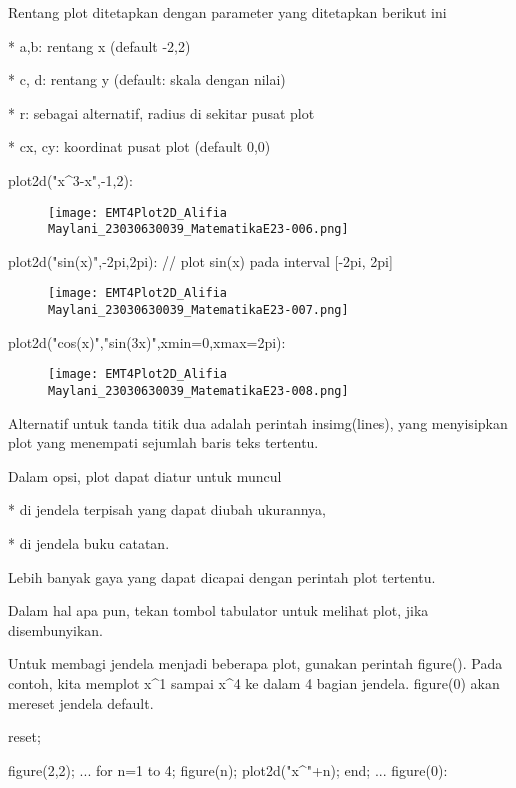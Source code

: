 \documentclass{article}
\begin{document}
Rentang plot ditetapkan dengan parameter yang ditetapkan berikut ini


* 
a,b: rentang x (default -2,2)

* 
c, d: rentang y (default: skala dengan nilai)

* 
r: sebagai alternatif, radius di sekitar pusat plot

* 
cx, cy: koordinat pusat plot (default 0,0)


\>plot2d("x^3-x",-1,2):


\begin{figure}
    \centering
    \texttt{[image: EMT4Plot2D\_Alifia Maylani\_23030630039\_MatematikaE23-006.png]}
    \caption{}
    \label{fig:enter-label}
\end{figure}

\>plot2d("sin(x)",-2\*pi,2\*pi): // plot sin(x) pada interval [-2pi, 2pi]


\begin{figure}
    \centering
    \texttt{[image: EMT4Plot2D\_Alifia Maylani\_23030630039\_MatematikaE23-007.png]}
    \caption{}
    \label{fig:enter-label}
\end{figure}

\>plot2d("cos(x)","sin(3\*x)",xmin=0,xmax=2pi):


\begin{figure}
    \centering
    \texttt{[image: EMT4Plot2D\_Alifia Maylani\_23030630039\_MatematikaE23-008.png]}
    \caption{}
    \label{fig:enter-label}
\end{figure}

Alternatif untuk tanda titik dua adalah perintah insimg(lines), yang
menyisipkan plot yang menempati sejumlah baris teks tertentu.


Dalam opsi, plot dapat diatur untuk muncul


* 
di jendela terpisah yang dapat diubah ukurannya,

* 
di jendela buku catatan.


Lebih banyak gaya yang dapat dicapai dengan perintah plot tertentu.


Dalam hal apa pun, tekan tombol tabulator untuk melihat plot, jika
disembunyikan.


Untuk membagi jendela menjadi beberapa plot, gunakan perintah
figure(). Pada contoh, kita memplot x^1 sampai x^4 ke dalam 4 bagian
jendela. figure(0) akan mereset jendela default.


\>reset;

\>figure(2,2); ...  
\>   for n=1 to 4; figure(n); plot2d("x^"+n); end; ...  
\>   figure(0):
\end{document}
